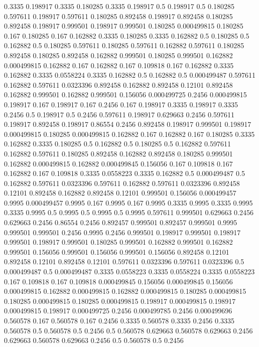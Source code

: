 0.3335 0.198917
0.3335 0.180285
0.3335 0.198917
0.5 0.198917
0.5 0.180285
0.597611 0.198917
0.597611 0.180285
0.892458 0.198917
0.892458 0.180285
0.892458 0.198917
0.999501 0.198917
0.999501 0.180285
0.000499815 0.180285
0.167 0.180285
0.167 0.162882
0.3335 0.180285
0.3335 0.162882
0.5 0.180285
0.5 0.162882
0.5 0.180285
0.597611 0.180285
0.597611 0.162882
0.597611 0.180285
0.892458 0.180285
0.892458 0.162882
0.999501 0.180285
0.999501 0.162882
0.000499815 0.162882
0.167 0.162882
0.167 0.109818
0.167 0.162882
0.3335 0.162882
0.3335 0.0558224
0.3335 0.162882
0.5 0.162882
0.5 0.000499487
0.597611 0.162882
0.597611 0.0323396
0.892458 0.162882
0.892458 0.12101
0.892458 0.162882
0.999501 0.162882
0.999501 0.156056
0.000499725 0.2456
0.000499815 0.198917
0.167 0.198917
0.167 0.2456
0.167 0.198917
0.3335 0.198917
0.3335 0.2456
0.5 0.198917
0.5 0.2456
0.597611 0.198917
0.629663 0.2456
0.597611 0.198917
0.892458 0.198917
0.86554 0.2456
0.892458 0.198917
0.999501 0.198917
0.000499815 0.180285
0.000499815 0.162882
0.167 0.162882
0.167 0.180285
0.3335 0.162882
0.3335 0.180285
0.5 0.162882
0.5 0.180285
0.5 0.162882
0.597611 0.162882
0.597611 0.180285
0.892458 0.162882
0.892458 0.180285
0.999501 0.162882
0.000499815 0.162882
0.000499845 0.156056
0.167 0.109818
0.167 0.162882
0.167 0.109818
0.3335 0.0558223
0.3335 0.162882
0.5 0.000499487
0.5 0.162882
0.597611 0.0323396
0.597611 0.162882
0.597611 0.0323396
0.892458 0.12101
0.892458 0.162882
0.892458 0.12101
0.999501 0.156056
0.000499457 0.9995
0.000499457 0.9995
0.167 0.9995
0.167 0.9995
0.3335 0.9995
0.3335 0.9995
0.3335 0.9995
0.5 0.9995
0.5 0.9995
0.5 0.9995
0.597611 0.999501
0.629663 0.2456
0.629663 0.2456
0.86554 0.2456
0.892457 0.999501
0.892457 0.999501
0.9995 0.999501
0.999501 0.2456
0.9995 0.2456
0.999501 0.198917
0.999501 0.198917
0.999501 0.198917
0.999501 0.180285
0.999501 0.162882
0.999501 0.162882
0.999501 0.156056
0.999501 0.156056
0.999501 0.156056
0.892458 0.12101
0.892458 0.12101
0.892458 0.12101
0.597611 0.0323396
0.597611 0.0323396
0.5 0.000499487
0.5 0.000499487
0.3335 0.0558223
0.3335 0.0558224
0.3335 0.0558223
0.167 0.109818
0.167 0.109818
0.000499845 0.156056
0.000499845 0.156056
0.000499815 0.162882
0.000499815 0.162882
0.000499815 0.180285
0.000499815 0.180285
0.000499815 0.180285
0.000499815 0.198917
0.000499815 0.198917
0.000499815 0.198917
0.000499725 0.2456
0.000499785 0.2456
0.000499696 0.560578
0.167 0.560578
0.167 0.2456
0.3335 0.560578
0.3335 0.2456
0.3335 0.560578
0.5 0.560578
0.5 0.2456
0.5 0.560578
0.629663 0.560578
0.629663 0.2456
0.629663 0.560578
0.629663 0.2456
0.5 0.560578
0.5 0.2456

